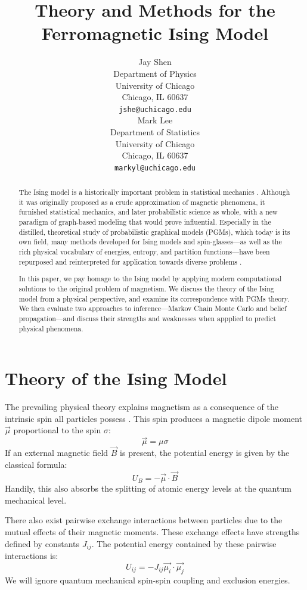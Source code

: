 \documentclass{article}
\title{Theory and Methods for the Ferromagnetic Ising Model}
\author{
    Jay Shen \\
    Department of Physics \\
    University of Chicago\\
    Chicago, IL 60637 \\
    \texttt{jshe@uchicago.edu} \\
    \And
    Mark Lee \\
    Department of Statistics \\
    University of Chicago\\
    Chicago, IL 60637 \\
    \texttt{markyl@uchicago.edu} \\
}
\begin{document}
\graphicspath{ {../graphics} }

\maketitle

\begin{abstract}

The Ising model is a historically important problem in statistical mechanics 
\cite{lenz1920}. 
Although it was originally proposed as a crude approximation of magnetic 
phenomena, it furnished statistical mechanics, and later probabilistic science 
as whole, with a new paradigm of graph-based modeling that would prove 
influential.
Especially in the distilled, theoretical study of probabilistic graphical 
models (PGMs), which today is its own field, many methods developed for Ising 
models and spin-glasses—as well as the rich physical vocabulary of energies, 
entropy, and partition functions—have been repurposed and reinterpreted for 
application towards diverse problems \cite{koller}. 

In this paper, we pay homage to the Ising model by applying modern computational 
solutions to the original problem of magnetism. 
We discuss the theory of the Ising model from a physical perspective, and 
examine its correspondence with PGMs theory. 
We then evaluate two approaches to inference—Markov Chain Monte Carlo and
belief propagation—and discuss their strengths and weaknesses when appplied to 
predict physical phenomena. 
%
%
%
%
%
\end{abstract}
%
%
%
%
%
\section{Theory of the Ising Model}

The prevailing physical theory explains magnetism as a consequence of the 
intrinsic spin all particles possess \cite{griffiths}. 
This spin produces a magnetic dipole moment $\vec{\mu}$ proportional to the 
spin $\sigma$:
\[\vec{\mu} = \mu \sigma\]
If an external magnetic field $\vec{B}$ is present, the potential energy is 
given by the classical formula:
\[U_B = - \vec{\mu} \cdot \vec{B}\]
Handily, this also absorbs the splitting of atomic energy levels at the quantum 
mechanical level. 

There also exist pairwise exchange interactions between particles due to the 
mutual effects of their magnetic moments.
These exchange effects have strengths defined by constants $J_{ij}$. 
The potential energy contained by these pairwise interactions is:
\[U_{ij} = - J_{ij} \vec{\mu_i} \cdot \vec{\mu_j}\]
We will ignore quantum mechanical spin-spin coupling and exclusion energies. 
\end{document}
